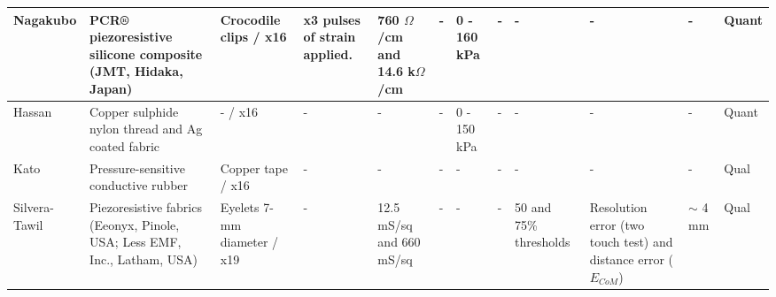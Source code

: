 \begin{landscape}
\begin{table}[H]
\begin{tabular}{|L{1.7cm}|L{2.8cm}|L{2.0cm}|L{2.1cm}|L{2.2cm}|L{2.0cm}|L{1.7cm}|L{1.7cm}|L{2.4cm}|L{2.2cm}|L{1.6cm}|L{1.5cm}|}
			Nagakubo \citep{Nagakubo2007} & PCR® piezoresistive silicone composite (JMT, Hidaka, Japan) & Crocodile clips / x16 & x3 pulses of strain applied. & 760 $\Omega$/cm and 14.6 k$\Omega$/cm & - & 0 - 160 kPa & - & - & - & - & Quant \\ \hline
			
			Hassan \citep{Hassan2009} & Copper sulphide nylon thread and Ag coated fabric & - / x16 & - & - & - & 0 - 150 kPa & - & - & - & - & Quant \\ \hline
			
			Kato \citep{Kato2007b} & Pressure-sensitive conductive rubber & Copper tape / x16 & - & - & - & - & - & - & - & - & Qual \\ \hline
			
			Silvera-Tawil \citep{Tawil2011} & Piezoresistive fabrics (Eeonyx, Pinole, USA; Less EMF, Inc., Latham, USA) & Eyelets 7-mm diameter / x19 & - & 12.5 mS/sq and 660 mS/sq & - & - & - & 50 and 75\% thresholds & Resolution error (two touch test) and distance error ($E_{CoM}$) & $\sim$ 4 mm & Qual \\ \hline
			
		\end{tabular}
	\end{table}
\end{landscape}

